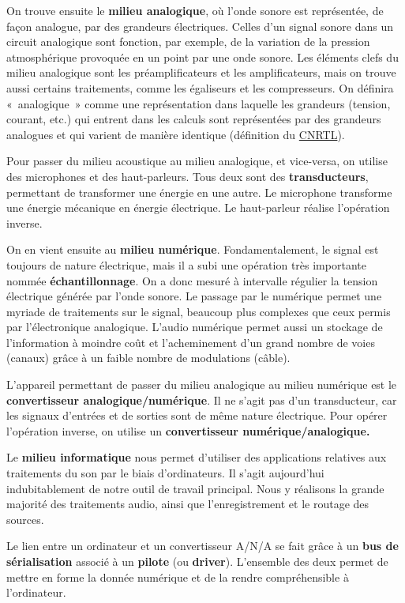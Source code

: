 \documentclass[
]{book}
\begin{document}
On trouve ensuite le \textbf{milieu analogique}, où l'onde sonore est représentée, de façon analogue, par des grandeurs électriques. Celles d'un signal sonore dans un circuit analogique sont fonction, par exemple, de la variation de la pression atmosphérique provoquée en un point par une onde sonore. Les éléments clefs du milieu analogique sont les préamplificateurs et les amplificateurs, mais on trouve aussi certains traitements, comme les égaliseurs et les compresseurs. On définira «~analogique~» comme une représentation dans laquelle les grandeurs (tension, courant, etc.) qui entrent dans les calculs sont représentées par des grandeurs analogues et qui varient de manière identique (définition du \href{https://www.cnrtl.fr/definition/analogique}{CNRTL}).

Pour passer du milieu acoustique au milieu analogique, et vice-versa, on utilise des microphones et des haut-parleurs. Tous deux sont des \textbf{transducteurs}, permettant de transformer une énergie en une autre. Le microphone transforme une énergie mécanique en énergie électrique. Le haut-parleur réalise l'opération inverse.

On en vient ensuite au \textbf{milieu numérique}. Fondamentalement, le signal est toujours de nature électrique, mais il a subi une opération très importante nommée \textbf{échantillonnage}. On a donc mesuré à intervalle régulier la tension électrique générée par l'onde sonore. Le passage par le numérique permet une myriade de traitements sur le signal, beaucoup plus complexes que ceux permis par l'électronique analogique. L'audio numérique permet aussi un stockage de l'information à moindre coût et l'acheminement d'un grand nombre de voies (canaux) grâce à un faible nombre de modulations (câble).

L'appareil permettant de passer du milieu analogique au milieu numérique est le \textbf{convertisseur analogique/numérique}. Il ne s'agit pas d'un transducteur, car les signaux d'entrées et de sorties sont de même nature électrique. Pour opérer l'opération inverse, on utilise un \textbf{convertisseur numérique/analogique.}

Le \textbf{milieu informatique} nous permet d'utiliser des applications relatives aux traitements du son par le biais d'ordinateurs. Il s'agit aujourd'hui indubitablement de notre outil de travail principal. Nous y réalisons la grande majorité des traitements audio, ainsi que l'enregistrement et le routage des sources.

Le lien entre un ordinateur et un convertisseur A/N/A se fait grâce à un \textbf{bus de sérialisation} associé à un \textbf{pilote} (ou \textbf{driver}). L'ensemble des deux permet de mettre en forme la donnée numérique et de la rendre compréhensible à l'ordinateur.
\end{document}
